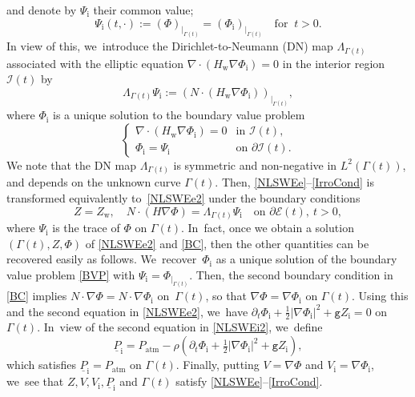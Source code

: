 \documentclass[10pt]{amsart}
\newcommand{\gr}{{\mathtt g}}
\newcommand{\dt}{\partial_t}
\newcommand{\cI}{{\mathcal I}}
\newcommand{\cE}{{\mathcal E}}
\newcommand{\ul}[1]{\underline{#1}}
\newcommand{\itGamma}{\mathit{\Gamma}}
\theoremstyle{definition}
\begin{document}
and denote by $\Psi_\mathrm{i}$ their common value;
\begin{equation}\label{ContPhi}
\Psi_\mathrm{i}(t,\cdot):= (\Phi)_{\vert_{ \itGamma(t)}}=(\Phi_\mathrm{i})_{\vert_{ \itGamma(t)}} \quad\text{for } \ t>0.
\end{equation}
In view of this, we~introduce the Dirichlet-to-Neumann (DN) map $\Lambda_{\itGamma(t)}$ associated with the elliptic equation
$\nabla\cdot(H_\mathrm{w}\nabla\Phi_\mathrm{i})=0$ in the interior region $\cI(t)$ by
\begin{equation}\label{defDN}
\Lambda_{\itGamma(t)} \Psi_\mathrm{i}:= (N\cdot (H_\mathrm{w}\nabla\Phi_\mathrm{i}))_{\vert_{\itGamma(t)}},
\end{equation}
where $\Phi_\mathrm{i}$ is a unique solution to the boundary value problem
\begin{equation}\label{BVP}
\begin{cases}
\nabla\cdot(H_\mathrm{w}\nabla\Phi_\mathrm{i})=0 &\text{in } \cI(t), \\
\Phi_\mathrm{i}=\Psi_\mathrm{i} &\text{on } \partial\cI(t).
\end{cases}
\end{equation}
We note that the DN map $\Lambda_{\itGamma(t)}$ is symmetric and non-negative in $L^2(\itGamma(t))$, and depends on the unknown curve $\itGamma(t)$.
Then, \eqref{NLSWEe}--\eqref{IrroCond} is transformed equivalently to~\eqref{NLSWEe2} under the boundary conditions
\begin{equation}\label{BC}
Z=Z_\mathrm{w}, \quad N\cdot(H\nabla\Phi)=\Lambda_{\itGamma(t)}\Psi_\mathrm{i} \quad\text{on } \partial\cE(t), \ t>0,
\end{equation}
where $\Psi_\mathrm{i}$ is the trace of $\Phi$ on $\itGamma(t)$. In~fact, once we obtain a solution $(\itGamma(t),Z,\Phi)$ of \eqref{NLSWEe2} and \eqref{BC}, then the other quantities can be recovered easily as follows. We~recover~$\Phi_\mathrm{i}$ as a unique solution of the boundary value problem \eqref{BVP} with $\Psi_\mathrm{i}=\Phi_{\vert_{\itGamma(t)}}$.
Then, the second boundary condition in \eqref{BC} implies $N\cdot\nabla\Phi=N\cdot\nabla\Phi_\mathrm{i}$ on~$\itGamma(t)$,
so that $\nabla\Phi=\nabla\Phi_\mathrm{i}$ on $\itGamma(t)$.
Using this and the second equation in \eqref{NLSWEe2}, we~have $\dt\Phi_\mathrm{i} + \frac12|\nabla\Phi_\mathrm{i}|^2 + \gr Z_\mathrm{i} = 0$ on $\itGamma(t)$. In~view of the second equation in \eqref{NLSWEi2}, we~define
\begin{equation}\label{defPi}
\ul{P}_\mathrm{i}=P_\mathrm{atm}-\rho(\dt\Phi_\mathrm{i} + \tfrac12|\nabla\Phi_\mathrm{i}|^2 + \gr Z_\mathrm{i}),
\end{equation}
which satisfies $\ul{P}_\mathrm{i}=P_\mathrm{atm}$ on $\itGamma(t)$.
Finally, putting $V=\nabla\Phi$ and $V_\mathrm{i}=\nabla\Phi_\mathrm{i}$, we~see that $Z,V,V_\mathrm{i},\ul{P}_\mathrm{i}$ and $\itGamma(t)$ satisfy \eqref{NLSWEe}--\eqref{IrroCond}.
\end{document}
